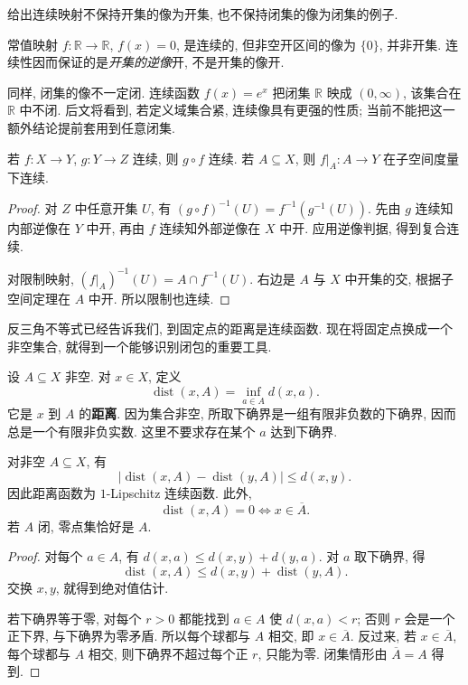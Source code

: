 \begin{example}
给出连续映射不保持开集的像为开集, 也不保持闭集的像为闭集的例子.
\end{example}
\begin{solution}
常值映射 $f:\mathbb{R}\to\mathbb{R}$, $f(x)=0$, 是连续的, 但非空开区间的像为 $\{0\}$, 并非开集. 连续性因而保证的是\emph{开集的逆像}开, 不是开集的像开.

同样, 闭集的像不一定闭. 连续函数 $f(x)=e^x$ 把闭集 $\mathbb{R}$ 映成 $(0,\infty)$, 该集合在 $\mathbb{R}$ 中不闭. 后文将看到, 若定义域集合紧, 连续像具有更强的性质; 当前不能把这一额外结论提前套用到任意闭集.
\end{solution}

\begin{proposition}[复合与限制]\label{ch:seq:composition}
若 $f:X\to Y$, $g:Y\to Z$ 连续, 则 $g\circ f$ 连续. 若 $A\subseteq X$, 则 $f|_A:A\to Y$ 在子空间度量下连续.
\end{proposition}
\begin{proof}
对 $Z$ 中任意开集 $U$, 有
$(g\circ f)^{-1}(U)=f^{-1}(g^{-1}(U))$. 先由 $g$ 连续知内部逆像在 $Y$ 中开, 再由 $f$ 连续知外部逆像在 $X$ 中开. 应用逆像判据, 得到复合连续.

对限制映射, $(f|_A)^{-1}(U)=A\cap f^{-1}(U)$. 右边是 $A$ 与 $X$ 中开集的交, 根据子空间定理在 $A$ 中开. 所以限制也连续.
\end{proof}

\label{ch:seq:distance-functions}
反三角不等式已经告诉我们, 到固定点的距离是连续函数. 现在将固定点换成一个非空集合, 就得到一个能够识别闭包的重要工具.

\begin{definition}[距离函数]
设 $A\subseteq X$ 非空. 对 $x\in X$, 定义
\[
 \operatorname{dist}(x,A)=\inf_{a\in A}d(x,a).
\]
它是 $x$ 到 $A$ 的\textbf{距离}. 因为集合非空, 所取下确界是一组有限非负数的下确界, 因而总是一个有限非负实数. 这里不要求存在某个 $a$ 达到下确界.
\end{definition}

\begin{theorem}[距离函数的连续性与零点]\label{ch:seq:distance-set}
对非空 $A\subseteq X$, 有
\[
 |\operatorname{dist}(x,A)-\operatorname{dist}(y,A)|\le d(x,y).
\]
因此距离函数为 $1$-Lipschitz 连续函数. 此外,
\[
 \operatorname{dist}(x,A)=0\Longleftrightarrow x\in\overline A.
\]
若 $A$ 闭, 零点集恰好是 $A$.
\end{theorem}
\begin{proof}
对每个 $a\in A$, 有 $d(x,a)\le d(x,y)+d(y,a)$. 对 $a$ 取下确界, 得
\[
 \operatorname{dist}(x,A)\le d(x,y)+\operatorname{dist}(y,A).
\]
交换 $x,y$, 就得到绝对值估计.

若下确界等于零, 对每个 $r>0$ 都能找到 $a\in A$ 使 $d(x,a)<r$; 否则 $r$ 会是一个正下界, 与下确界为零矛盾. 所以每个球都与 $A$ 相交, 即 $x\in\overline A$. 反过来, 若 $x\in\overline A$, 每个球都与 $A$ 相交, 则下确界不超过每个正 $r$, 只能为零. 闭集情形由 $\overline A=A$ 得到.
\end{proof}

